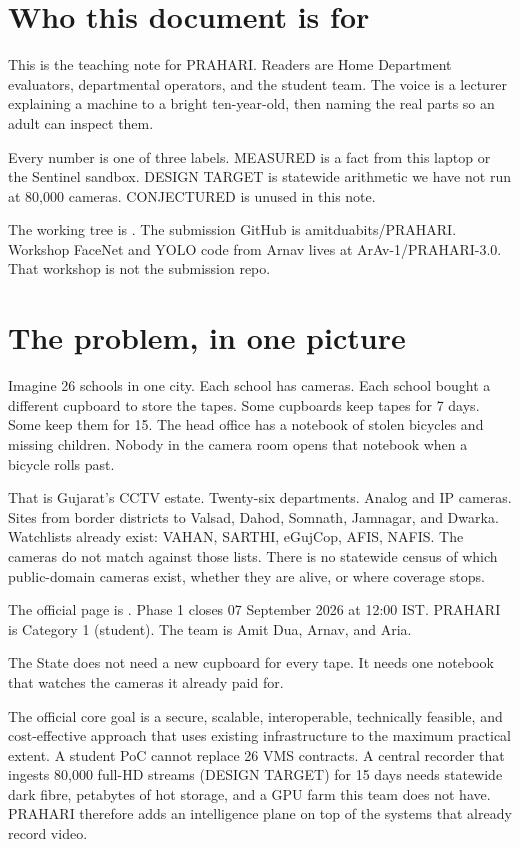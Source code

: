 \documentclass[listings]{csf301-notes}
\begin{document}
\notestitle

\section{Who this document is for}
This is the teaching note for PRAHARI. Readers are Home Department evaluators, departmental operators, and the student team. The voice is a lecturer explaining a machine to a bright ten-year-old, then naming the real parts so an adult can inspect them.

Every number is one of three labels. MEASURED is a fact from this laptop or the Sentinel sandbox. DESIGN TARGET is statewide arithmetic we have not run at 80{,}000 cameras. CONJECTURED is unused in this note.

The working tree is . The submission GitHub is amitduabits/PRAHARI. Workshop FaceNet and YOLO code from Arnav lives at ArAv-1/PRAHARI-3.0. That workshop is not the submission repo.

\section{The problem, in one picture}
Imagine 26 schools in one city. Each school has cameras. Each school bought a different cupboard to store the tapes. Some cupboards keep tapes for 7 days. Some keep them for 15. The head office has a notebook of stolen bicycles and missing children. Nobody in the camera room opens that notebook when a bicycle rolls past.

That is Gujarat's CCTV estate. Twenty-six departments. Analog and IP cameras. Sites from border districts to Valsad, Dahod, Somnath, Jamnagar, and Dwarka. Watchlists already exist: VAHAN, SARTHI, eGujCop, AFIS, NAFIS. The cameras do not match against those lists. There is no statewide census of which public-domain cameras exist, whether they are alive, or where coverage stops.

The official page is . Phase 1 closes 07 September 2026 at 12:00 IST. PRAHARI is Category 1 (student). The team is Amit Dua, Arnav, and Aria.

\begin{keyidea}
The State does not need a new cupboard for every tape. It needs one notebook that watches the cameras it already paid for.
\end{keyidea}

The official core goal is a secure, scalable, interoperable, technically feasible, and cost-effective approach that uses existing infrastructure to the maximum practical extent. A student PoC cannot replace 26 VMS contracts. A central recorder that ingests 80{,}000 full-HD streams (DESIGN TARGET) for 15 days needs statewide dark fibre, petabytes of hot storage, and a GPU farm this team does not have. PRAHARI therefore adds an intelligence plane on top of the systems that already record video.
\end{document}
